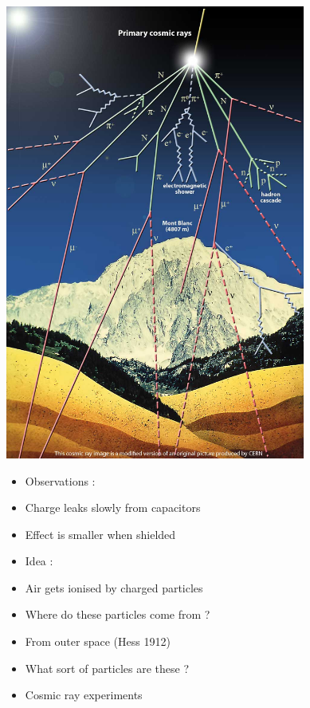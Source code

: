 \begin{center}
\includegraphics[keepaspectratio,height=15cm]{cosray}
\end{center}

\newpage

\vspace*{1cm}
\begin{itemize}
\item Observations :
\item[] Charge leaks slowly from capacitors
\item[] Effect is smaller when shielded
\item Idea :
\item[] Air gets ionised by charged particles
\item Where do these particles come from ?
\item[] From outer space (Hess 1912)
\item What sort of particles are these ?
\item[] Cosmic ray experiments
\end{itemize}


